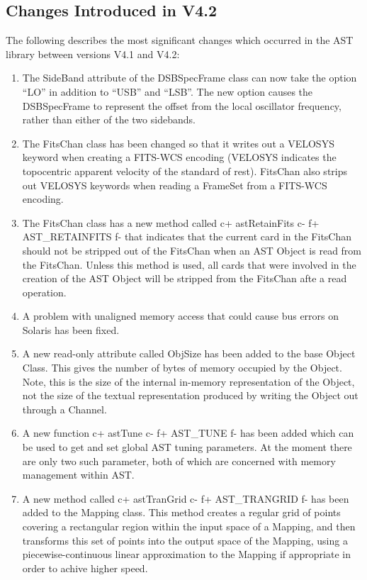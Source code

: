 \documentclass[twoside,11pt]{starlink}
\begin{document}
\subsection{Changes Introduced in V4.2}

The following describes the most significant changes which
occurred in the AST library between versions V4.1 and V4.2:

\begin{enumerate}

\item The SideBand attribute of the DSBSpecFrame class can now take the
option ``LO'' in addition to ``USB'' and ``LSB''. The new option causes the
DSBSpecFrame to represent the offset from the local oscillator frequency,
rather than either of the two sidebands.

\item The FitsChan class has been changed so that it writes out a VELOSYS
keyword when creating a FITS-WCS encoding (VELOSYS indicates the topocentric
apparent velocity of the standard of rest). FitsChan also strips out VELOSYS
keywords when reading a FrameSet from a FITS-WCS encoding.

\item The FitsChan class has a new method called
c+
astRetainFits
c-
f+
AST\_RETAINFITS
f-
that indicates that the current card in the FitsChan should not be
stripped out of the FitsChan when an AST Object is read from the FitsChan.
Unless this method is used, all cards that were involved in the creation
of the AST Object will be stripped from the FitsChan afte a read operation.

\item A problem with unaligned memory access that could cause bus errors on
Solaris has been fixed.

\item A new read-only attribute called ObjSize has been added to the base
Object Class. This gives the number of bytes of memory occupied by the
Object. Note, this is the size of the internal in-memory representation of
the Object, not the size of the textual representation produced by
writing the Object out through a Channel.

\item A new function
c+
astTune
c-
f+
AST\_TUNE
f-
has been added which can be used to get and set global AST tuning
parameters. At the moment there are only two such parameter, both of
which are concerned with memory management within AST.

\item A new method called
c+
astTranGrid
c-
f+
AST\_TRANGRID
f-
has been added to the Mapping class. This method creates a regular
grid of points covering a rectangular region within the input space of a
Mapping, and then transforms this set of points into the output space of the
Mapping, using a piecewise-continuous linear approximation to the Mapping
if appropriate in order to achive higher speed.


\end{enumerate}
\end{document}
